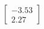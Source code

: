 \documentclass[preview]{standalone}
\begin{document}
\begin{align*}
\begin{bmatrix} -3.53 \\ 2.27 \end{bmatrix}
\end{align*}
\end{document}
